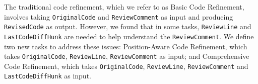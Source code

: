 
The traditional code refinement, which we refer to as Basic Code Refinement, involves taking \texttt{OriginalCode} and \texttt{ReviewComment} as input and producing \texttt{RevisedCode} as output. However, we found that in some tasks, \texttt{ReviewLine} and \texttt{LastCodeDiffHunk} are needed to help understand the \texttt{ReviewComment}. 
We define two new tasks to address these issues: Position-Aware Code Refinement, which takes \texttt{OriginalCode}, \texttt{ReviewLine}, \texttt{ReviewComment} as input; and Comprehensive Code Refinement, which takes \texttt{OriginalCode}, \texttt{ReviewLine}, \texttt{ReviewComment} and \texttt{LastCodeDiffHunk} as input.



